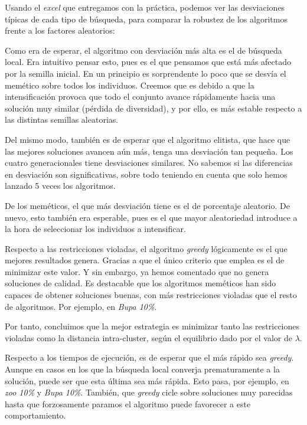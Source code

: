 \documentclass[11pt]{article}
\begin{document}
Usando el \emph{excel} que entregamos con la práctica, podemos ver las desviaciones típicas de cada tipo de búsqueda, para comparar la robustez de los algoritmos frente a los factores aleatorios:


Como era de esperar, el algoritmo con desviación más alta es el de búsqueda local. Era intuitivo pensar esto, pues es el que pensamos que está más afectado por la semilla inicial. En un principio es sorprendente lo poco que se desvía el memético sobre todos los individuos. Creemos que es debido a que la intensificación provoca que todo el conjunto avance rápidamente hacia una solución muy similar (pérdida de diversidad), y por ello, es más estable respecto a las distintas semillas aleatorias.

Del mismo modo, también es de esperar que el algoritmo elitista, que hace que las mejores soluciones avancen aún más, tenga una desviación tan pequeña. Los cuatro generacionales tiene desviaciones similares. No sabemos si las diferencias en desviación son significativas, sobre todo teniendo en cuenta que solo hemos lanzado 5 veces los algoritmos.

De los meméticos, el que más desviación tiene es el de porcentaje aleatorio. De nuevo, esto también era esperable, pues es el que mayor aleatoriedad introduce a la hora de seleccionar los individuos a intensificar.

Respecto a las restricciones violadas, el algoritmo \emph{greedy} lógicamente es el que mejores resultados genera. Gracias a que el único criterio que emplea es el de minimizar este valor. Y sin embargo, ya hemos comentado que no genera soluciones de calidad. Es destacable que los algoritmos meméticos han sido capaces de obtener soluciones buenas, con más restricciones violadas que el resto de algoritmos. Por ejemplo, en \emph{Bupa 10\%}.

Por tanto, concluimos que la mejor estrategia es minimizar tanto las restricciones violadas como la distancia intra-cluster, según el equilibrio dado por el valor de $\lambda$.

Respecto a los tiempos de ejecución, es de esperar que el más rápido sea \emph{greedy}. Aunque en casos en los que la búsqueda local converja prematuramente a la solución, puede ser que esta última sea más rápida. Esto pasa, por ejemplo, en \emph{zoo 10\%} y \emph{Bupa 10\%}. También, que \emph{greedy} cicle sobre soluciones muy parecidas hasta que forzosamente paramos el algoritmo puede favorecer a este comportamiento.
\end{document}
